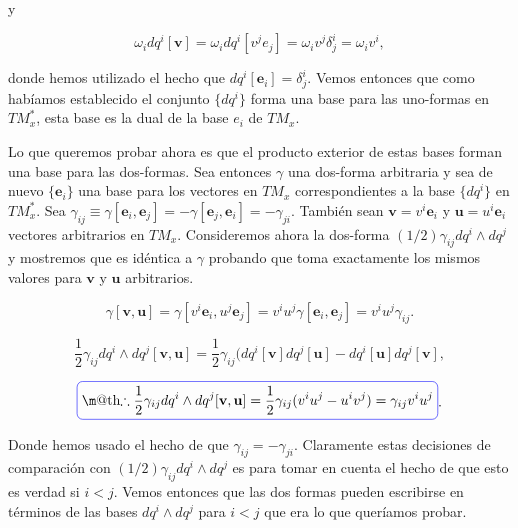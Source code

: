 \documentclass[a4paper,10pt]{article}
\makeatletter
\numberwithin{equation}{section}
\newcommand*{\boxcolor}{blue}
\renewcommand{\boxed}[1]{\textcolor{\boxcolor}{%
\tikz[baseline={([yshift=-1ex]current bounding box.center)}] \node [rectangle, minimum width=1ex,rounded corners,draw] {\normalcolor\m@th$\displaystyle#1$};}}
\makeatother
\begin{document}
y

\begin{equation}
 \omega_i dq^i[\mathbf{v}] = \omega_i dq^i[v^j e_j] = \omega_i v^j \delta^i_j = \omega_i v^i,
\end{equation}

donde hemos utilizado el hecho que $dq^i[\mathbf{e}_i] = \delta^i_j$. Vemos entonces que 
como habíamos establecido el conjunto $\{dq^i\}$ forma una base para las uno-formas 
en $TM_x^*$, esta base es la dual de la base $e_i$ de $TM_x$. 

\vspace{.3cm}

Lo que queremos probar ahora es que el producto exterior de estas bases forman una 
base para las dos-formas. Sea entonces $\gamma$ una dos-forma arbitraria y sea de nuevo 
$\{\mathbf{e}_i\}$ una base para los vectores en $TM_x$ correspondientes a la base 
$\{dq^i \}$ en $TM_x^*$. Sea $\gamma_{ij} \equiv \gamma[\mathbf{e}_i,\mathbf{e}_j] = 
- \gamma[\mathbf{e}_j,\mathbf{e}_i] = - \gamma_{ji}$. También sean $\mathbf{v} = v^i\mathbf{e}_i$ 
y $\mathbf{u} = u^i\mathbf{e}_i$ vectores arbitrarios en $TM_x$. Consideremos ahora la 
dos-forma $(1/2)\gamma_{ij}dq^i \wedge dq^j$ y mostremos que es idéntica a $\gamma$ 
probando que toma exactamente los mismos valores para $\mathbf{v}$ y $\mathbf{u}$ arbitrarios.

\begin{equation}
 \gamma[\mathbf{v},\mathbf{u}] = \gamma[v^i\mathbf{e}_i,u^j\mathbf{e}_j] = 
 v^iu^j\gamma[\mathbf{e}_i,\mathbf{e}_j] = v^iu^j\gamma_{ij}.
\end{equation}

\begin{equation}
 \frac{1}{2}\gamma_{ij} dq^i \wedge dq^j [\mathbf{v},\mathbf{u}] = 
 \frac{1}{2}\gamma_{ij}(dq^i[\mathbf{v}]dq^j[\mathbf{u}] - dq^i[\mathbf{u}]dq^j[\mathbf{v}],
\end{equation}

\begin{equation}
 \boxed{\therefore \frac{1}{2}\gamma_{ij} dq^i \wedge dq^j [\mathbf{v},\mathbf{u}] = 
 \frac{1}{2}\gamma_{ij}(v^iu^j - u^iv^j) = \gamma_{ij}v^iu^j}.
\end{equation}

Donde hemos usado el hecho de que $\gamma_{ij} = - \gamma_{ji}$. Claramente estas decisiones 
de comparación con $(1/2)\gamma_{ij}dq^i \wedge dq^j$ es para tomar en cuenta el hecho 
de que esto es verdad si $i < j$. Vemos entonces que las dos formas pueden escribirse 
en términos de las bases $dq^i \wedge dq^j$ para $i < j$ que era lo que queríamos probar.
\end{document}
